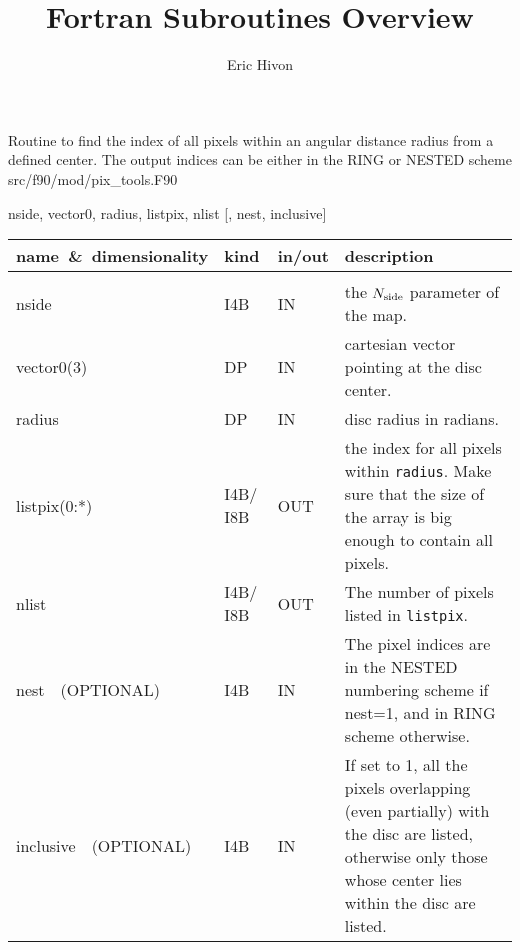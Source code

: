 
\sloppy


\title{\healpix Fortran Subroutines Overview}
 \section[query\_disc]{ }
\label{sub:query_disc}
\author{Eric Hivon}

\begin{facility}
{Routine to find the index of all pixels within an angular distance radius from a defined
center. The output indices can be either in the RING or NESTED scheme} 
{src/f90/mod/pix\_tools.F90}
\end{facility}

\begin{f90format}
{nside, vector0, radius, listpix, nlist [, nest, inclusive]}
\end{f90format}

\begin{arguments}
{
\begin{tabular}{p{0.28\hsize} p{0.05\hsize} p{0.1\hsize} p{0.47\hsize}} \hline 
\textbf{name~\&~dimensionality} & \textbf{kind} & \textbf{in/out} & \textbf{description} \\ \hline
                   &   &   &                           \\ %
nside & I4B & IN & the ${N_{\rm side}}$ parameter of the map. \\
vector0(3) & DP & IN & cartesian vector pointing at the disc center. \\
radius & DP & IN & disc radius in radians. \\
listpix(0:*) & I4B/ I8B & OUT & the index for all pixels within {\tt radius}. Make sure that the size of the array is big enough to contain all pixels. \\ 
nlist & I4B/ I8B & OUT & The number of pixels listed in {\tt listpix}. \\
nest\ \ (OPTIONAL) & I4B & IN &  The pixel indices are in the NESTED numbering
                   scheme if nest=1, and in RING scheme otherwise. \\
inclusive\ \ (OPTIONAL) & I4B & IN & If set to 1, all the pixels overlapping
                   (even partially)
                   with the disc are listed, otherwise only those whose
                   center lies within the disc are listed. \\

\end{tabular}
}
\end{arguments}

